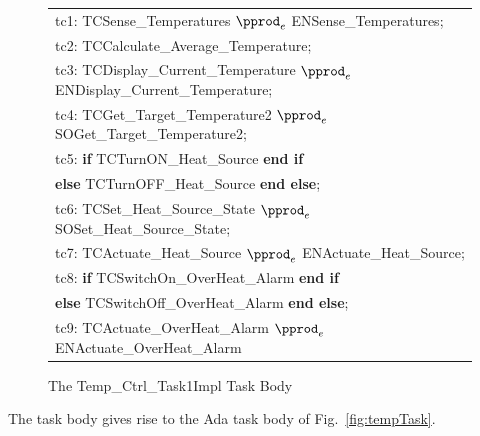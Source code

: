 %
\begin{figure}
\begin{sffamily}
\begin{center}
\begin{minipage}{0.8\linewidth}
\begin{tabular}{l}
tc1: TCSense\_Temperatures $\pprod_e$ ENSense\_Temperatures; \\
tc2: TCCalculate\_Average\_Temperature; \\
tc3: TCDisplay\_Current\_Temperature $\pprod_e$ ENDisplay\_Current\_Temperature; \\
tc4: TCGet\_Target\_Temperature2 $\pprod_e$ SOGet\_Target\_Temperature2; \\
tc5: \textbf{if} TCTurnON\_Heat\_Source \textbf{end if} \\
\qquad \textbf{else} TCTurnOFF\_Heat\_Source \textbf{end else}; \\
tc6: TCSet\_Heat\_Source\_State $\pprod_e$ SOSet\_Heat\_Source\_State; \\
tc7: TCActuate\_Heat\_Source $\pprod_e$ ENActuate\_Heat\_Source; \\
tc8: \textbf{if} TCSwitchOn\_OverHeat\_Alarm \textbf{end if} \\
\qquad \textbf{else} TCSwitchOff\_OverHeat\_Alarm \textbf{end else}; \\
tc9: TCActuate\_OverHeat\_Alarm $\pprod_e$ ENActuate\_OverHeat\_Alarm 
\end{tabular}
\end{minipage}
\end{center}
\end{sffamily}
	\caption{The Temp\_Ctrl\_Task1Impl Task Body}
	\label{fig:taskBody}
\end{figure}
%
The task body gives rise to the Ada task body of Fig.~\ref{fig:tempTask}. 
%
